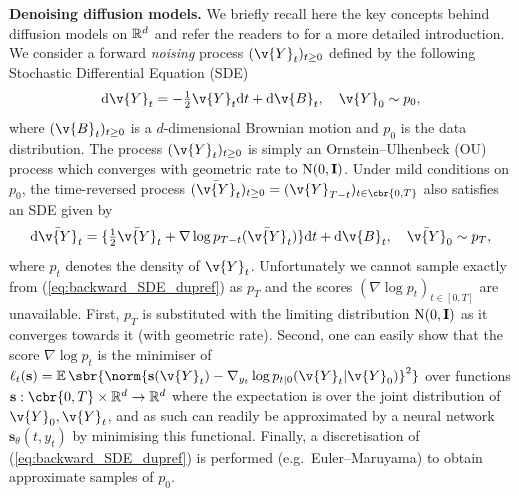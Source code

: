 \textbf{Denoising diffusion models.}
We briefly recall here the key concepts behind diffusion models on \(\mathbb{R}^d\) and refer the readers to \cite{song2020score} for a more detailed introduction.
We consider a forward \emph{noising} process \((\v{Y}_t)_{t \geq 0}\) defined by the following Stochastic Differential Equation (SDE) \begin{equation}\label{eq:forward_SDE_dupref} \mathrm{d} \v{Y}_t = -\tfrac{1}{2} \v{Y}_t \mathrm{d} t + \mathrm{d} \v{B}_t,\quad \v{Y}_0 \sim p_0 , \end{equation} where \((\v{B}_t)_{t \geq 0}\) is a \(d\)-dimensional Brownian motion and \(p_0\) is the data distribution.
The process \((\v{Y}_t)_{t \geq 0}\) is simply an Ornstein--Ulhenbeck (OU) process which converges with geometric rate to \(\mathrm{N}(0,\m{I})\).
Under mild conditions on \(p_0\), the time-reversed process \((\bar{\v{Y}}_t)_{t \geq 0} = (\v{Y}_{T-t})_{t \in \cbr{0,T}}\) also satisfies an SDE \parencite{cattiaux2021time,haussmann1986time} given by \begin{equation} \mathrm{d} \bar{\v{Y}}_t = \{ \tfrac{1}{2} \bar{\v{Y}}_t + \nabla \log p_{T-t}(\bar{\v{Y}}_t)\} \mathrm{d} t + \mathrm{d} \v{B}_t,\quad \bar{\v{Y}}_0 \sim p_T, \label{eq:backward_SDE_dupref} \end{equation} where \(p_t\) denotes the density of \(\v{Y}_t\).
Unfortunately we cannot sample exactly from (\ref{eq:backward_SDE_dupref}) as \(p_T\) and the scores \((\nabla \log p_t)_{t\in[0,T]}\) are unavailable.
First, \(p_T\) is substituted with the limiting distribution \(\mathrm{N}(0,\m{I})\) as it converges towards it (with geometric rate).
Second, one can easily show that the score \(\nabla \log p_t\) is the minimiser of \(\ell_t(\mathbf{s}) = \E\sbr{\norm{\mathbf{s}(\v{Y}_t) - \nabla_{y_t} \log p_{t|0}(\v{Y}_t|\v{Y}_0)}^2}\) over functions \(\mathbf{s}: \cbr{0,T} \times \R^d \to \R^d\) where the expectation is over the joint distribution of \(\v{Y}_0,\v{Y}_t\), and as such can readily be approximated by a neural network \(\mathbf{s}_\theta(t, y_t)\) by minimising this functional.
Finally, a discretisation of (\ref{eq:backward_SDE_dupref}) is performed (e.g.\ Euler--Maruyama) to obtain approximate samples of \(p_0\).

